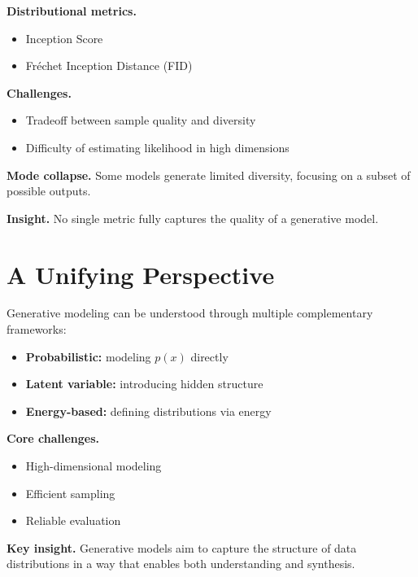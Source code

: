 \medskip

\noindent
\textbf{Distributional metrics.}
\begin{itemize}
    \item Inception Score
    \item Fr\'echet Inception Distance (FID)
\end{itemize}

\medskip

\noindent
\textbf{Challenges.}
\begin{itemize}
    \item Tradeoff between sample quality and diversity
    \item Difficulty of estimating likelihood in high dimensions
\end{itemize}

\medskip

\noindent
\textbf{Mode collapse.}  
Some models generate limited diversity, focusing on a subset of possible outputs.

\medskip

\noindent
\textbf{Insight.}  
No single metric fully captures the quality of a generative model.

\section{A Unifying Perspective}

Generative modeling can be understood through multiple complementary frameworks:

\begin{itemize}
    \item \textbf{Probabilistic:} modeling $p(x)$ directly
    \item \textbf{Latent variable:} introducing hidden structure
    \item \textbf{Energy-based:} defining distributions via energy
\end{itemize}

\medskip

\noindent
\textbf{Core challenges.}
\begin{itemize}
    \item High-dimensional modeling
    \item Efficient sampling
    \item Reliable evaluation
\end{itemize}

\medskip

\noindent
\textbf{Key insight.}  
Generative models aim to capture the structure of data distributions in a way that enables both understanding and synthesis.


